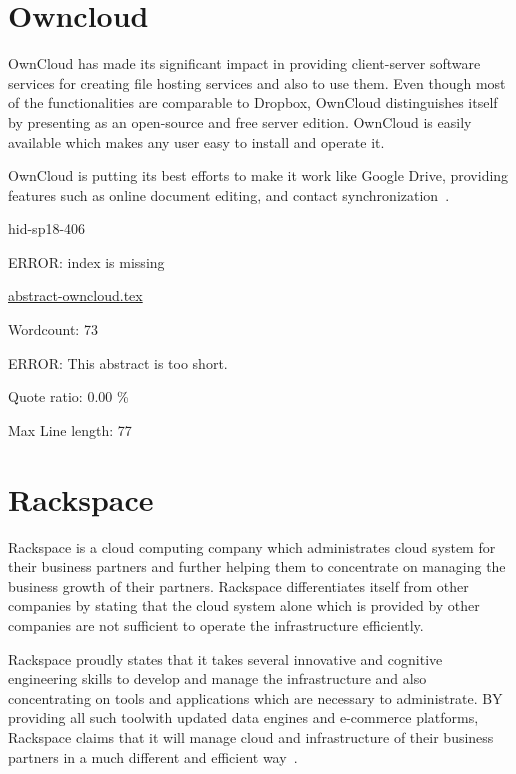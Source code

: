\section{Owncloud}

OwnCloud has made its significant impact in providing client-server software
services for creating file hosting services and also to use them. Even though
most of the functionalities are comparable to Dropbox, OwnCloud distinguishes
itself by presenting as an open-source and free server edition. OwnCloud is
easily available which makes any user easy to install and operate it.

OwnCloud is putting its best efforts to make it work like Google Drive,
providing features such as online document editing, and contact
synchronization~\cite{hid-sp18-406-Owncloud}.


\begin{IU}

hid-sp18-406

ERROR: index is missing

\href{https://github.com/cloudmesh-community/hid-sp18-406/blob/master//technology/abstract-owncloud.tex}{abstract-owncloud.tex}

 

Wordcount: 73

ERROR: This abstract is too short.


Quote ratio: 0.00 \%
 
Max Line length: 77
\end{IU}

\section{Rackspace}

Rackspace is a cloud computing company which administrates cloud system for their
business partners and further helping them to concentrate on managing the
business growth of their partners. Rackspace differentiates itself from other
companies by stating that the cloud system alone which is provided by other
companies are not sufficient to operate the infrastructure efficiently.

Rackspace proudly states that it takes several innovative and cognitive
engineering skills to develop and manage the infrastructure and also
concentrating on tools and applications which are necessary to administrate. BY
providing all such toolwith updated data engines and e-commerce platforms,
Rackspace claims that it will manage cloud and infrastructure of their business
partners in a much different and efficient way~\cite{hid-sp18-406-Rackspace}.



